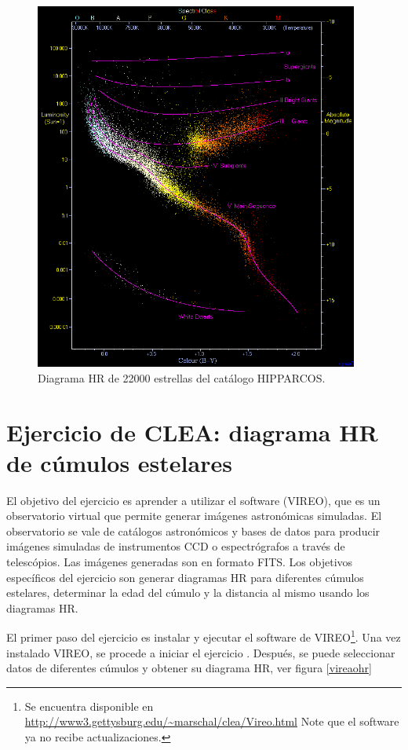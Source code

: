 \documentclass[12pt]{article}
\begin{document}
\begin{figure}[H]
  \centering
    \label{diag}
   \includegraphics[width= 4.20in]{HRdiag.png}
  \caption{Diagrama HR de 22000 estrellas del catálogo HIPPARCOS.\cite{hrdiag}  }

\end{figure}


\section{Ejercicio de CLEA: diagrama HR de cúmulos estelares}
El objetivo del ejercicio es aprender a utilizar el software  (VIREO), que es un observatorio virtual que permite generar imágenes astronómicas simuladas.
El observatorio se vale de catálogos astronómicos y bases de datos para producir imágenes simuladas de instrumentos CCD o espectrógrafos a través de telescópios.
Las imágenes generadas son en formato FITS.
Los objetivos específicos del ejercicio son generar diagramas HR para diferentes cúmulos estelares, determinar la edad del cúmulo y la distancia al mismo usando los diagramas HR.

El primer paso del ejercicio es instalar y ejecutar el software de VIREO\footnote{Se encuentra disponible en \url{http://www3.gettysburg.edu/~marschal/clea/Vireo.html} Note que el software ya no recibe actualizaciones.}.
Una vez instalado VIREO, se procede a iniciar el ejercicio . Después, se puede seleccionar datos de diferentes cúmulos y obtener su diagrama HR, ver figura \ref{vireaohr}
\end{document}
